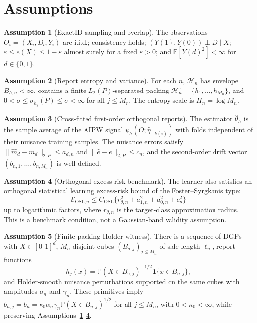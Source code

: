 \documentclass[11pt]{article}
\newcommand{\E}{\mathbb{E}}
\renewcommand{\Pr}{\mathbb{P}}
\newcommand{\one}{\mathbf{1}}
\newcommand{\calH}{\mathcal{H}}
\theoremstyle{definition}
\newtheorem{assumption}{Assumption}
\theoremstyle{plain}
\theoremstyle{remark}
\begin{document}
\section{Assumptions}\label{sec:assumptions}
\begin{assumption}[ExactID sampling and overlap]\label{ass:exactid}
The observations \(O_i=(X_i,D_i,Y_i)\) are i.i.d.; consistency holds; \((Y(1),Y(0))\perp D\mid X\); \(\varepsilon\leq e(X)\leq 1-\varepsilon\) almost surely for a fixed \(\varepsilon>0\); and \(\E[Y(d)^2]<\infty\) for \(d\in\{0,1\}\).
\end{assumption}

\begin{assumption}[Report entropy and variance]\label{ass:entropy}
For each \(n\), \(\calH_n\) has envelope \(B_{h,n}<\infty\), contains a finite
\(L_2(P)\)-separated packing
\(\calH_n^\circ=\{h_1,\ldots,h_{M_n}\}\), and
\(0<\underline\sigma\leq\sigma_{h_j}(P)\leq\overline\sigma<\infty\) for all
\(j\leq M_n\).  The entropy scale is \(H_n=\log M_n\).
\end{assumption}

\begin{assumption}[Cross-fitted first-order orthogonal reports]\label{ass:dml}
The estimator \(\widehat\theta_h\) is the sample average of the AIPW signal
\(\psi_h(O;\widehat\eta_{-k(i)})\) with folds independent of their nuisance
training samples.  The nuisance errors satisfy
\(\|\widehat m_d-m_d\|_{2,P}\leq a_{d,n}\) and
\(\|\widehat e-e\|_{2,P}\leq c_n\), and the second-order drift vector
\((b_{n,1},\ldots,b_{n,M_n})\) is well-defined.
\end{assumption}

\begin{assumption}[Orthogonal excess-risk benchmark]\label{ass:osl}
The learner also satisfies an orthogonal statistical learning excess-risk
bound of the Foster--Syrgkanis type:
\[
\mathcal E_{\mathrm{OSL},n}
\leq C_{\mathrm{OSL}}\{r_{\theta,n}^2+a_{1,n}^2+a_{0,n}^2+c_n^2\}
\]
up to logarithmic factors, where \(r_{\theta,n}\) is the target-class
approximation radius.  This is a benchmark condition, not a Gaussian-band
validity assumption.
\end{assumption}

\begin{assumption}[Finite-packing Holder witness]\label{ass:witness}
There is a sequence of DGPs with \(X\in[0,1]^d\), \(M_n\) disjoint cubes
\((B_{n,j})_{j\leq M_n}\) of side length \(\ell_n\), report functions
\[
h_j(x)=\Pr(X\in B_{n,j})^{-1/2}\one\{x\in B_{n,j}\},
\]
and Holder-smooth nuisance perturbations supported on the same cubes with
amplitudes \(\alpha_n\) and \(\gamma_n\).  These primitives imply
\(b_{n,j}=b_n=\kappa_0\alpha_n\gamma_n\Pr(X\in B_{n,j})^{1/2}\) for all
\(j\leq M_n\), with \(0<\kappa_0<\infty\), while preserving
Assumptions~\ref{ass:exactid}--\ref{ass:osl}.
\end{assumption}
\end{document}
